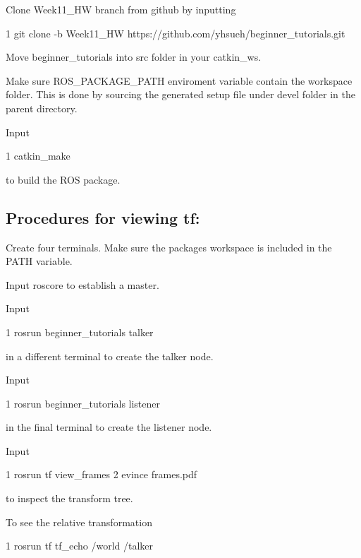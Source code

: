 
\begin{DoxyEnumerate}
\item Clone Week11\+\_\+\+HW branch from github by inputting 
\begin{DoxyCode}
1 git clone -b Week11\_HW https://github.com/yhsueh/beginner\_tutorials.git
\end{DoxyCode}

\item Move beginner\+\_\+tutorials into src folder in your catkin\+\_\+ws.
\end{DoxyEnumerate}
\begin{DoxyEnumerate}
\item Make sure R\+O\+S\+\_\+\+P\+A\+C\+K\+A\+G\+E\+\_\+\+P\+A\+TH enviroment variable contain the workspace folder. This is done by sourcing the generated setup file under devel folder in the parent directory.
\item Input 
\begin{DoxyCode}
1 catkin\_make
\end{DoxyCode}
 to build the R\+OS package.
\end{DoxyEnumerate}

\subsection*{Procedures for viewing tf\+:}


\begin{DoxyEnumerate}
\item Create four terminals. Make sure the package\textquotesingle{}s workspace is included in the P\+A\+TH variable.
\item Input roscore to establish a master.
\item Input 
\begin{DoxyCode}
1 rosrun beginner\_tutorials talker
\end{DoxyCode}
 in a different terminal to create the talker node.
\item Input 
\begin{DoxyCode}
1 rosrun beginner\_tutorials listener
\end{DoxyCode}
 in the final terminal to create the listener node.
\item Input 
\begin{DoxyCode}
1 rosrun tf view\_frames
2 evince frames.pdf
\end{DoxyCode}
 to inspect the transform tree.
\item To see the relative transformation 
\begin{DoxyCode}
1 rosrun tf tf\_echo /world /talker
\end{DoxyCode}

\end{DoxyEnumerate}

